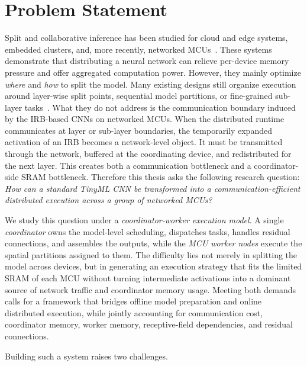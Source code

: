 \section{Problem Statement}
\label{sec:intro:problem-statement}
Split and collaborative inference has been studied for cloud and edge systems, embedded clusters, and, more recently, networked MCUs~\cite{split-modnn,split-neurosurgeon,split-cnn}. These systems demonstrate that distributing a neural network can relieve per-device memory pressure and offer aggregated computation power. However, they mainly optimize \emph{where} and \emph{how} to split the model. Many existing designs still organize execution around layer-wise split points, sequential model partitions, or fine-grained sub-layer tasks~\cite{split-modnn,split-cnn,split-pico}.
What they do not address is the communication boundary induced by the IRB-based CNNs on networked MCUs. When the distributed runtime communicates at layer or sub-layer boundaries, the temporarily expanded activation of an IRB becomes a network-level object. It must be transmitted through the network, buffered at the coordinating device, and redistributed for the next layer. This creates both a communication bottleneck and a coordinator-side SRAM bottleneck. 
Therefore this thesis asks the following research question: \emph{How can a standard TinyML CNN be transformed into a communication-efficient distributed execution across a group of networked MCUs?} 

We study this question under a \textit{coordinator-worker execution model}.
A single \textit{coordinator} owns the model-level scheduling, dispatches tasks, handles residual connections, and assembles the outputs, while the \textit{MCU worker nodes} execute the spatial partitions assigned to them. The difficulty lies not merely in splitting the model across devices, but in generating an execution strategy that fits the limited SRAM of each MCU without turning intermediate activations into a dominant source of network traffic and coordinator memory usage.
Meeting both demands calls for a framework that bridges offline model preparation and online distributed execution, while jointly accounting for communication cost, coordinator memory, worker memory, receptive-field dependencies, and residual connections.

Building such a system raises two challenges.

